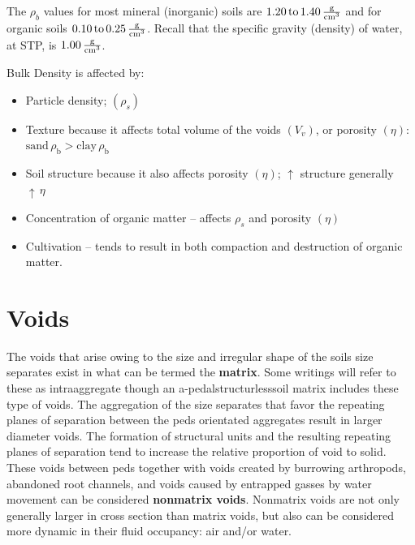 \documentclass[a5paper]{report}
\begin{document}
The $\rho_b$ values for most mineral (inorganic) soils are $\ce{1.20 to 1.40 \frac{g}{cm^3}}$ and for organic soils $\ce{0.10 to 0.25 \frac{g}{cm^3}}$. Recall that the specific gravity (density) of water, at STP, is $\ce{1.00 \frac{g}{cm^3}}$.

Bulk Density is affected by:
\begin{itemize}
    \item Particle density; $\left(\rho_s\right)$
    \item Texture because it affects total volume of the voids $\left(V_v\right)$, or porosity $\left(\eta\right)$:  $\text{sand}\,\rho_{\text{b}} > \text{clay}\,\rho_{\text{b}}$
    \item Soil structure because it also affects porosity $\left(\eta\right)$; $\uparrow$  structure generally $\uparrow\,\eta$
    \item Concentration of organic matter – affects $\rho_s$ and porosity $\left(\eta\right)$
    \item Cultivation – tends to result in both compaction and destruction of organic matter.
\end{itemize}

\section{Voids}
\label{voids}

The voids that arise owing to the size and irregular shape of the soils size separates exist in what can be termed the \textbf{matrix}. Some writings will refer to these as intraaggregate though an a-pedal\textemdash{}structurless\textemdash{}soil matrix includes these type of voids. The aggregation of the size separates that favor the repeating planes of separation between the peds orientated aggregates result in larger diameter voids. The formation of structural units and the resulting repeating planes of separation tend to increase the relative proportion of void to solid.  These voids between peds together with voids created by burrowing arthropods, abandoned root channels, and voids caused by entrapped gasses by water movement can be considered \textbf{nonmatrix voids}. Nonmatrix voids are not only generally larger in cross section than matrix voids, but also can be considered more dynamic in their fluid occupancy: air and/or water.  

\end{document}
